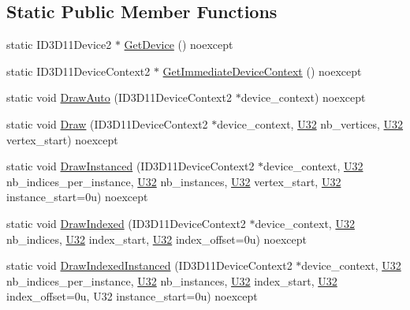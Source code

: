 \subsection*{Static Public Member Functions}
\begin{DoxyCompactItemize}
\item 
static I\+D3\+D11\+Device2 $\ast$ \hyperlink{structmage_1_1_pipeline_a5ee450d9d2a1dc333c7491a13376dca3}{Get\+Device} () noexcept
\item 
static I\+D3\+D11\+Device\+Context2 $\ast$ \hyperlink{structmage_1_1_pipeline_af3a32798924091ccd874121889338163}{Get\+Immediate\+Device\+Context} () noexcept
\item 
static void \hyperlink{structmage_1_1_pipeline_a5f7752ae2ada0e9b1f46b3f0c7a00ba5}{Draw\+Auto} (I\+D3\+D11\+Device\+Context2 $\ast$device\+\_\+context) noexcept
\item 
static void \hyperlink{structmage_1_1_pipeline_ae883f95c99de73d1ac9dbfb40542b17a}{Draw} (I\+D3\+D11\+Device\+Context2 $\ast$device\+\_\+context, \hyperlink{namespacemage_a41c104c036fba3756a74e19f793eeaa1}{U32} nb\+\_\+vertices, \hyperlink{namespacemage_a41c104c036fba3756a74e19f793eeaa1}{U32} vertex\+\_\+start) noexcept
\item 
static void \hyperlink{structmage_1_1_pipeline_a8999b598a43adb99e710be8dc4c9949e}{Draw\+Instanced} (I\+D3\+D11\+Device\+Context2 $\ast$device\+\_\+context, \hyperlink{namespacemage_a41c104c036fba3756a74e19f793eeaa1}{U32} nb\+\_\+indices\+\_\+per\+\_\+instance, \hyperlink{namespacemage_a41c104c036fba3756a74e19f793eeaa1}{U32} nb\+\_\+instances, \hyperlink{namespacemage_a41c104c036fba3756a74e19f793eeaa1}{U32} vertex\+\_\+start, \hyperlink{namespacemage_a41c104c036fba3756a74e19f793eeaa1}{U32} instance\+\_\+start=0u) noexcept
\item 
static void \hyperlink{structmage_1_1_pipeline_a8680ab529da5c0faeecb990e94ab8d25}{Draw\+Indexed} (I\+D3\+D11\+Device\+Context2 $\ast$device\+\_\+context, \hyperlink{namespacemage_a41c104c036fba3756a74e19f793eeaa1}{U32} nb\+\_\+indices, \hyperlink{namespacemage_a41c104c036fba3756a74e19f793eeaa1}{U32} index\+\_\+start, \hyperlink{namespacemage_a41c104c036fba3756a74e19f793eeaa1}{U32} index\+\_\+offset=0u) noexcept
\item 
static void \hyperlink{structmage_1_1_pipeline_a73d0bec83516f68ed4c4c6d9d4bd68c2}{Draw\+Indexed\+Instanced} (I\+D3\+D11\+Device\+Context2 $\ast$device\+\_\+context, \hyperlink{namespacemage_a41c104c036fba3756a74e19f793eeaa1}{U32} nb\+\_\+indices\+\_\+per\+\_\+instance, \hyperlink{namespacemage_a41c104c036fba3756a74e19f793eeaa1}{U32} nb\+\_\+instances, \hyperlink{namespacemage_a41c104c036fba3756a74e19f793eeaa1}{U32} index\+\_\+start, \hyperlink{namespacemage_a41c104c036fba3756a74e19f793eeaa1}{U32} index\+\_\+offset=0u, U32 instance\+\_\+start=0u) noexcept

\end{DoxyCompactItemize}
